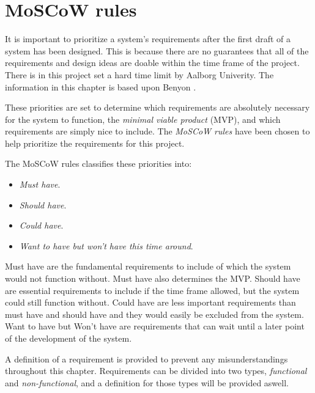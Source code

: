 \section{MoSCoW rules}\label{sec:requirements}

It is important to prioritize a system's requirements after the first draft of a system has been designed.
This is because there are no guarantees that all of the requirements and design ideas are doable within the time frame of the project.
There is in this project set a hard time limit by Aalborg Univerity.
The information in this chapter is based upon Benyon \cite{Benyon}.

These priorities are set to determine which requirements are absolutely necessary for the system to function, the \textit{minimal viable product} (MVP), and which requirements are simply nice to include.
The \textit{MoSCoW rules} have been chosen to help prioritize the requirements for this project.

The MoSCoW rules classifies these priorities into:

\begin{itemize}
    \item \textit{Must have}.
    \item \textit{Should have}.
    \item \textit{Could have}.
    \item \textit{Want to have but won’t have this time around}.
\end{itemize}

Must have are the fundamental requirements to include of which the system would not function without.
Must have also determines the MVP.
Should have are essential requirements to include if the time frame allowed, but the system could still function without.
Could have are less important requirements than must have and should have and they would easily be excluded from the system.
Want to have but Won't have are requirements that can wait until a later point of the development of the system.

A definition of a requirement is provided to prevent any misunderstandings throughout this chapter.
Requirements can be divided into two types, \textit{functional} and \textit{non-functional}, and a definition for those types will be provided aswell.

